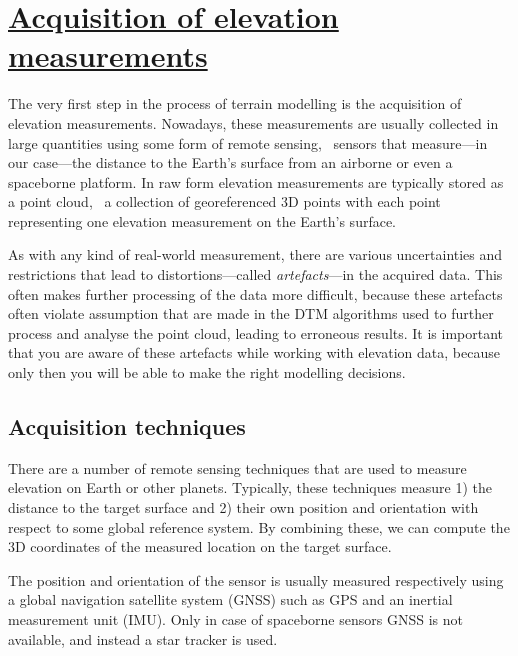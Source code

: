
\graphicspath{{acquisition/}}


\chapter{\protect\hyperlink{chap:\thechapter}{Acquisition of elevation measurements}}


\label{chap:acquisition}

The very first step in the process of terrain modelling is the acquisition of elevation measurements. 
Nowadays, these measurements are usually collected in large quantities using some form of remote sensing, \ie\ sensors that measure---in our case---the distance to the Earth's surface from an airborne or even a spaceborne platform. 
In raw form elevation measurements are typically stored as a point cloud, \ie\ a collection of georeferenced 3D points with each point representing one elevation measurement on the Earth's surface.

As with any kind of real-world measurement, there are various uncertainties and restrictions that lead to distortions---called \emph{artefacts}---in the acquired data. 
This often makes further processing of the data more difficult, because these artefacts often violate assumption that are made in the DTM algorithms used to further process and analyse the point cloud, leading to erroneous results. 
It is important that you are aware of these artefacts while working with elevation data, because only then you will be able to make the right modelling decisions. 


\section{Acquisition techniques}
\label{sec:acquisistion-techniques}
There are a number of remote sensing techniques that are used to measure elevation on Earth or other planets. 
Typically, these techniques measure 1) the distance to the target surface and 2) their own position and orientation with respect to some global reference system. 
By combining these, we can compute the 3D coordinates of the measured location on the target surface. 

The position and orientation of the sensor is usually measured respectively using a global navigation satellite system (GNSS) such as GPS and an inertial measurement unit (IMU).
Only in case of spaceborne sensors GNSS is not available, and instead a star tracker is used.

